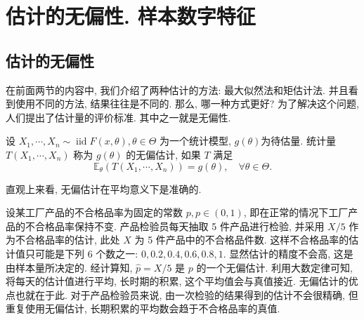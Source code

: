 \section{估计的无偏性. 样本数字特征}

\subsection{估计的无偏性}

在前面两节的内容中, 我们介绍了两种估计的方法: 最大似然法和矩估计法. 并且看到使用不同的方法, 结果往往是不同的. 那么, 哪一种方式更好? 为了解决这个问题, 人们提出了估计量的评价标准. 其中之一就是无偏性. 
\begin{definition}
    设 $X_1, \cdots, X_n \sim \operatorname{iid} F(x, \theta), \theta \in \Theta$ 为一个统计模型, $g(\theta)$为待估量. 统计量 $T\left(X_1, \cdots, X_n\right)$ 称为 $g(\theta)$ 的无偏估计, 如果 $T$ 满足
$$
\mathbb{E}_\theta\left(T\left(X_1, \cdots, X_n\right)\right)=g(\theta), \quad \forall \theta \in \Theta .
$$
\end{definition}

直观上来看, 无偏估计在平均意义下是准确的. 

\begin{example}
    设某工厂产品的不合格品率为固定的常数 $p, p \in(0,1)$, 即在正常的情况下工厂产品的不合格品率保持不变. 产品检验员每天抽取 5 件产品进行检验, 并采用 $X / 5$ 作为不合格品率的估计, 此处 $X$ 为 5 件产品中的不合格品件数. 这样不合格品率的估计值只可能是下列 6 个数之一: $0,0.2,0.4,0.6,0.8,1$. 显然估计的精度不会高, 这是由样本量所决定的. 经计算知, $\hat{p}=X / 5$ 是 $p$ 的一个无偏估计. 利用大数定律可知, 将每天的估计值进行平均, 长时期的积累, 这个平均值会与真值接近. 无偏估计的优点也就在于此. 对于产品检验员来说, 由一次检验的结果得到的估计不会很精确, 但重复使用无偏估计, 长期积累的平均数会趋于不合格品率的真值. 
\end{example}

